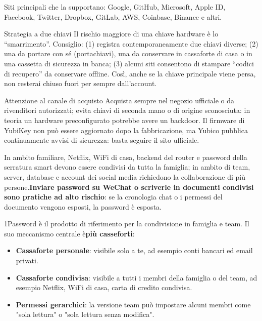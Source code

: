 Siti principali che la supportano: Google, GitHub, Microsoft, Apple ID, Facebook, Twitter, Dropbox, GitLab, AWS, Coinbase, Binance e altri.

\begin{tcbinfo}{Strategia a due chiavi}
Il rischio maggiore di una chiave hardware è lo “smarrimento”. Consiglio: (1) registra contemporaneamente due chiavi diverse; (2) una da portare con sé (portachiavi), una da conservare in cassaforte di casa o in una cassetta di sicurezza in banca; (3) alcuni siti consentono di stampare “codici di recupero” da conservare offline. Così, anche se la chiave principale viene persa, non resterai chiuso fuori per sempre dall'account.

\end{tcbinfo}

\begin{tcbwarn}{Attenzione al canale di acquisto}
Acquista sempre nel negozio ufficiale o da rivenditori autorizzati; evita chiavi di seconda mano o di origine sconosciuta: in teoria un hardware preconfigurato potrebbe avere un backdoor. Il firmware di YubiKey non può essere aggiornato dopo la fabbricazione, ma Yubico pubblica continuamente avvisi di sicurezza: basta seguire il sito ufficiale.

\end{tcbwarn}


In ambito familiare, Netflix, WiFi di casa, backend del router e password della serratura smart devono essere condivisi da tutta la famiglia; in ambito di team, server, database e account dei social media richiedono la collaborazione di più persone.\textbf{Inviare password su WeChat o scriverle in documenti condivisi sono pratiche ad alto rischio}: se la cronologia chat o i permessi del documento vengono esposti, la password è esposta.


1Password è il prodotto di riferimento per la condivisione in famiglia e team. Il suo meccanismo centrale è\textbf{più casseforti}:

\begin{itemize}
  \item \textbf{Cassaforte personale}: visibile solo a te, ad esempio conti bancari ed email privati.
  \item \textbf{Cassaforte condivisa}: visibile a tutti i membri della famiglia o del team, ad esempio Netflix, WiFi di casa, carta di credito condivisa.
  \item \textbf{Permessi gerarchici}: la versione team può impostare alcuni membri come "sola lettura" o "sola lettura senza modifica".
\end{itemize}

